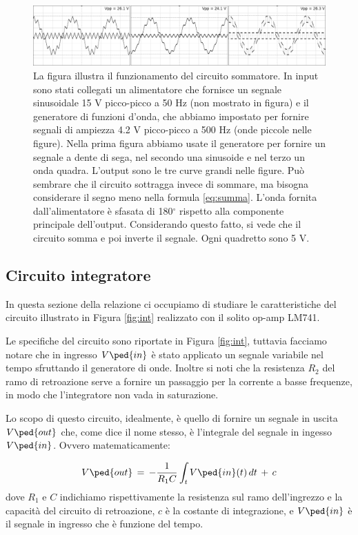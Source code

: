 \begin{figure}[h]
    \includegraphics[width=\textwidth]{sum.png}
    \caption{La figura illustra il funzionamento del circuito sommatore. In input sono stati collegati un alimentatore che
        fornisce un segnale sinusoidale 15 V picco-picco a 50 Hz (non mostrato in figura) e
        il generatore di funzioni d'onda, che abbiamo impostato per fornire segnali di ampiezza
        4.2 V picco-picco a 500 Hz (onde piccole nelle figure). Nella prima figura abbiamo usate il generatore
        per fornire un segnale a dente di sega,
        nel secondo una sinusoide e nel terzo un onda quadra. L'output sono le tre curve grandi nelle figure. Può sembrare che
        il circuito sottragga invece di sommare, ma bisogna considerare il segno meno nella formula \eqref{eq:summa}.
        L'onda fornita dall'alimentatore è sfasata di 180$^\circ$ rispetto alla componente principale dell'output. Considerando
        questo fatto, si vede che il circuito somma e poi inverte il segnale. Ogni quadretto sono 5 V.
        }
    \label{fig:sums}
\end{figure}

\subsection*{Circuito integratore}

In questa sezione della relazione ci occupiamo di studiare le caratteristiche del circuito illustrato in Figura \ref{fig:int} realizzato con il solito op-amp LM741.

Le specifiche del circuito sono riportate in Figura \ref{fig:int}, tuttavia facciamo notare che in ingresso $V\ped{in}$ è stato applicato un segnale variabile nel tempo sfruttando il generatore di onde. Inoltre si noti che la resistenza $R_2$ del ramo di
retroazione serve a fornire un passaggio per la corrente a basse frequenze, in modo che l'integratore non vada in saturazione.
 
Lo scopo di questo circuito, idealmente, è quello di fornire un segnale in uscita $V\ped{out}$ che,
come dice il nome stesso, è l'integrale del segnale in ingesso $V\ped{in}$. Ovvero matematicamente:

\begin{equation}
    V\ped{out}\,=\,-\frac{1}{R_1C} \int_{t}{V\ped{in}(t) \, dt}\,+\,c
\end{equation}
%
dove $R_1$ e $C$ indichiamo rispettivamente la resistenza sul ramo dell'ingrezzo e la capacità del circuito di retroazione,
$c$ è la costante di integrazione, e $V\ped{in}$ è il segnale in ingresso che è funzione del tempo.

